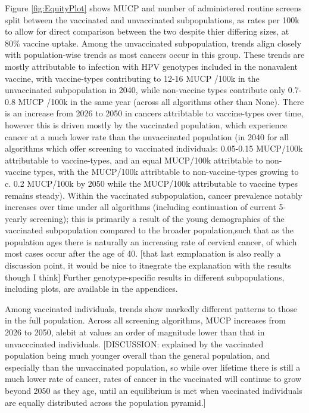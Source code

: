 Figure \ref{fig:EquityPlot} shows MUCP and number of administered routine screens split between the vaccinated and unvaccinated subpopulations, as rates per 100k to allow for direct comparison between the two despite thier differing sizes, at 80\% vaccine uptake. Among the unvaccinated subpopulation, trends align closely with population-wise trends as most cancers occur in this group. These trends are mostly attributable to infection with HPV genotypes included in the nonavalent vaccine, with vaccine-types contributing to 12-16 MUCP /100k in the unvaccinated subpopulation in 2040, while non-vaccine types contribute only 0.7-0.8 MUCP /100k in the same year (across all algorithms other than None). There is an increase from 2026 to 2050 in cancers attribtable to vaccine-types over time, however this is driven mostly by the vaccinated population, which experience cancer at a much lower rate than the unvaccinated population (in 2040 for all algorithms which offer screening to vaccinated individuals: 0.05-0.15 MUCP/100k attributable to vaccine-types, and an equal MUCP/100k attribtable to non-vaccine types, with the MUCP/100k attribtable to non-vaccine-types growing to c. 0.2 MUCP/100k by 2050 while the MUCP/100k attributable to vaccine types remains steady). Within the vaccinated subpopulation, cancer prevalence notably increases over time under all algorithms (including continuation of current 5-yearly screening); this is primarily a result of the young demographics of the vaccinated subpopulation compared to the broader population,such that as the population ages there is naturally an increasing rate of cervical cancer, of which most cases occur after the age of 40. [that last exmplanation is also really a discussion point, it would be nice to itnegrate the explanation with the results though I think] Further genotype-specific results in different subpopulations, including plots, are available in the appendices.  


Among vaccinated individuals, trends show markedly different patterns to those in the full population. Across all screening algorithms, MUCP increases from 2026 to 2050, alebit at values an order of magnitude lower than that in unvacccinated individuals. [DISCUSSION: explained by the vaccinated population being much younger overall than the general population, and especially than the unvaccinated population, so while over lifetime there is still a much lower rate of cancer, rates of cancer in the vaccinated will continue to grow beyond 2050 as they age, until an equilibrium is met when vaccinated individuals are equally distributed across the population pyramid.] 


